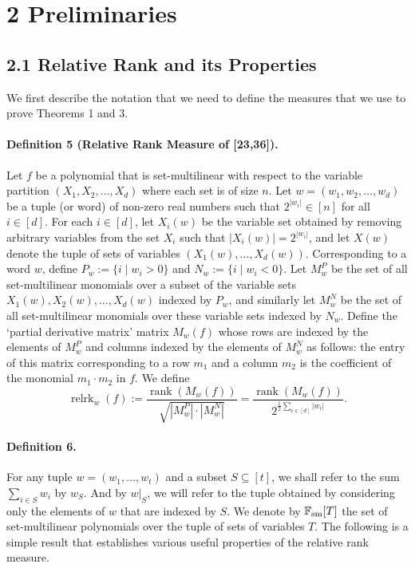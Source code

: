 \section*{2 Preliminaries}
\subsection*{2.1 Relative Rank and its Properties}
We first describe the notation that we need to define the measures that we use to prove Theorems 1 and 3.
\paragraph{Definition 5 (Relative Rank Measure of [23,36]).} Let $f$ be a polynomial that is set-multilinear with respect to the variable partition $(X_1,X_2,\ldots,X_d)$ where each set is of size $n$. Let $w=(w_1,w_2,\ldots,w_d)$ be a tuple (or word) of non-zero real numbers such that $2^{|w_i|}\in[n]$ for all $i\in[d]$. For each $i\in[d]$, let $X_i(w)$ be the variable set obtained by removing arbitrary variables from the set $X_i$ such that $|X_i(w)|=2^{|w_i|}$, and let $X(w)$ denote the tuple of sets of variables $(X_1(w),\ldots,X_d(w))$. Corresponding to a word $w$, define $P_w:=\{i\mid w_i>0\}$ and $N_w:=\{i\mid w_i<0\}$. Let $M_w^P$ be the set of all set-multilinear monomials over a subset of the variable sets $X_1(w),X_2(w),\ldots,X_d(w)$ indexed by $P_w$, and similarly let $M_w^N$ be the set of all set-multilinear monomials over these variable sets indexed by $N_w$.
Define the `partial derivative matrix' matrix $M_w(f)$ whose rows are indexed by the elements of $M_w^P$ and columns indexed by the elements of $M_w^N$ as follows: the entry of this matrix corresponding to a row $m_1$ and a column $m_2$ is the coefficient of the monomial $m_1\cdot m_2$ in $f$. We define
\[\operatorname{relrk}_w(f):=\frac{\operatorname{rank}(M_w(f))}{\sqrt{|M_w^P|\cdot|M_w^N|}}=\frac{\operatorname{rank}(M_w(f))}{2^{\frac12\sum_{i\in[d]}|w_i|}}.\]
\paragraph{Definition 6.} For any tuple $w=(w_1,\ldots,w_t)$ and a subset $S\subseteq[t]$, we shall refer to the sum $\sum_{i\in S}w_i$ by $w_S$. And by $w|_S$, we will refer to the tuple obtained by considering only the elements of $w$ that are indexed by $S$. We denote by $\mathbb F_{\rm sm}[T]$ the set of set-multilinear polynomials over the tuple of sets of variables $T$.
The following is a simple result that establishes various useful properties of the relative rank measure.
